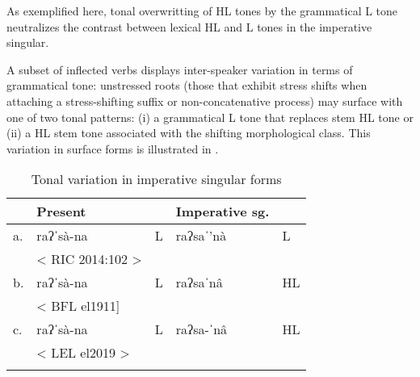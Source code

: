 As exemplified here, tonal overwritting of HL tones by the grammatical L tone neutralizes the contrast between lexical HL and L tones in the imperative singular.

A subset of inflected verbs displays inter-speaker variation in terms of grammatical tone: unstressed roots (those that exhibit stress shifts when attaching a stress-shifting suffix or non-concatenative process) may surface with one of two tonal patterns: (i) a grammatical L tone that replaces stem HL tone or (ii) a HL stem tone associated with the shifting morphological class. This variation in surface forms is illustrated in .



\begin{table}
\caption{Tonal variation in imperative singular forms}
\label{tab:variation-tone}

\begin{tabularx}{.7\textwidth}{lllll}
\lsptoprule
&\textbf{Present} &   & \textbf{Imperative sg.} &  \\
\midrule
a.&  raʔˈsà-na &	L	&	raʔsaˈ'nà &	L\\
& < RIC 2014:102 >\\
b.& raʔˈsà-na &	L	&	raʔsaˈnâ &	HL \\
&< BFL el1911]\\
c.& raʔˈsà-na &	L	&	raʔsa-ˈnâ &	HL \\
&< LEL el2019 >\\
\lspbottomrule
\end{tabularx}
\end{table}


